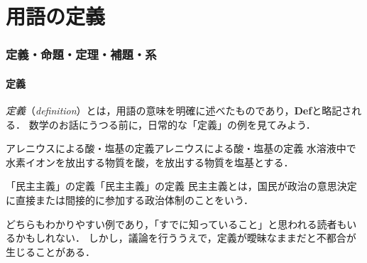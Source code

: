 \part{用語の定義}

\begin{abstract}
  この章では，数学の学習を始める前に，定義・命題・定理・補題・系などの基本的な用語について理解を深める．「『命題』という言葉は知っているけど，『定理』とはどう違うの？」という疑問を持ったり，「『定義』と『定理』の違いがあやふやなままで，よくわからない」と感じる学生は多い．まず，日常的な例と数学的な例をもとに「定義」の性質を確認する．次に，命題・定理・補題・系という用語を整理し，これらのラベルの使い分けについて注意を述べる．続いて，数学的主張の骨格をなす「存在」と「一意性」について，具体例をもとに整理する．最後に，「かつ・または」「とる・おく・固定する」「十分大きい」など，数学に特有の言い回しを具体例とともに確認しよう．
\end{abstract}

\section{定義・命題・定理・補題・系}

\subsection{定義}

\emph{定義}（\emph{definition}）とは，用語の意味を明確に述べたものであり，\textbf{Def}と略記される．
数学のお話にうつる前に，日常的な「定義」の例を見てみよう．

\begin{example}{アレニウスによる酸・塩基の定義}{アレニウスによる酸・塩基の定義}
  水溶液中で水素イオンを放出する物質を酸，を放出する物質を塩基とする．
\end{example}

\begin{example}{「民主主義」の定義}{「民主主義」の定義}
  民主主義とは，国民が政治の意思決定に直接または間接的に参加する政治体制のことをいう．
\end{example}

どちらもわかりやすい例であり，「すでに知っていること」と思われる読者もいるかもしれない．
しかし，議論を行ううえで，定義が曖昧なままだと不都合が生じることがある．

